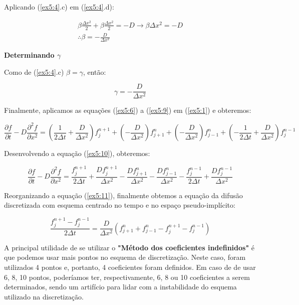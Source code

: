 \documentclass[11pt]{article}
\begin{document}
Aplicando (\ref{ex5:4}.c) em (\ref{ex5:4}.d):

\begin{equation}
    \begin{aligned}
        \beta{\frac{\Delta{x^2}}{2}} + \beta{\frac{\Delta{x^2}}{2}} = -D \to \beta{\Delta{x^2}} = -D \\
        \therefore \beta = -\frac{D}{\Delta{x^2}}
    \end{aligned}
    \label{ex5:8}
\end{equation}

\textbf{Determinando \(\gamma\)}

Como de (\ref{ex5:4}.c) \(\beta = \gamma\), então:

\begin{equation}
    \gamma = -\frac{D}{\Delta{x^2}}
    \label{ex5:9}
\end{equation}

Finalmente, aplicamos as equações (\ref{ex5:6}) a (\ref{ex5:9}) em
(\ref{ex5:1}) e obteremos:

\begin{equation}
\frac{\partial{f}}{\partial{t}} - D\frac{\partial^2{f}}{\partial{x^2}} =
    (\frac{1}{2\Delta{t}} + \frac{D}{\Delta{x^2}})f^{n+1}_{j} +
    (-\frac{D}{\Delta{x^2}})f^{n}_{j+1} +
    (-\frac{D}{\Delta{x^2}})f^{n}_{j-1} +
    (-\frac{1}{2\Delta{t}} + \frac{D}{\Delta{x^2}})f^{n-1}_{j}
    \label{ex5:10}
\end{equation}

Desenvolvendo a equação (\ref{ex5:10}), obteremos:

\begin{equation}
    \frac{\partial{f}}{\partial{t}} - D\frac{\partial^2{f}}{\partial{x^2}} =
    \frac{f^{n+1}_{j}}{2\Delta{t}} + \frac{Df^{n+1}_{j}}{\Delta{x^2}} -
    \frac{Df^{n}_{j+1}}{\Delta{x^2}} - \frac{Df^{n}_{j-1}}{\Delta{x^2}} -
    \frac{f^{n-1}_{j}}{2\Delta{t}} + \frac{Df^{n-1}_{j}}{\Delta{x^2}}
    \label{ex5:11}
\end{equation}

Reorganizando a equação (\ref{ex5:11}), finalmente obtemos a equação da
difusão discretizada com esquema centrado no tempo e no espaço
pseudo-implícito:

\begin{equation}
    \frac{f^{n+1}_{j} - f^{n-1}_{j}}{2\Delta{t}} =
    \frac{D}{\Delta{x^2}}(f^{n}_{j+1} + f^{n}_{j-1} - f^{n+1}_{j} - f^{n-1}_{j})
    \label{ex5:12}
\end{equation}

A principal utilidade de se utilizar o \textbf{"Método dos coeficientes
indefinidos"} é que podemos usar mais pontos no esquema de
discretização. Neste caso, foram utilizados 4 pontos e, portanto, 4
coeficientes foram definidos. Em caso de de usar 6, 8, 10 pontos,
poderíamos ter, respectivamente, 6, 8 ou 10 coeficientes a serem
determinados, sendo um artifício para lidar com a instabilidade do
esquema utilizado na discretização.
\end{document}
